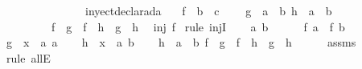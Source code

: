 \begin{isabellebody}
\ \ \ \ \ \ \isamarkupfalse%
\isanewline
\ \ \ \ \isamarkupfalse%
\isanewline
\ \ \isamarkupfalse%
\isanewline
{}\isamarkupfalse%
%
\endisatagproof
{\isafoldproof}%
%
\isadelimproof
\isanewline
%
\endisadelimproof
\isanewline
\isanewline
\isanewline
{}\isamarkupfalse%
\ inyectdeclarada{}{\isacharcolon}\isanewline
\ \ \ f\ {\isacharcolon}{\isacharcolon}\ {\isachardoublequoteopen}{\isacharprime}b\ {\isasymRightarrow}\ {\isacharprime}c{\isachardoublequoteclose}\ \isanewline
\ \ \ {\isachardoublequoteopen}{\isasymforall}{\isacharparenleft}g\ {\isacharcolon}{\isacharcolon}\ {\isacharprime}a\ {\isasymRightarrow}\ {\isacharprime}b{\isacharparenright}\ {\isacharparenleft}h\ {\isacharcolon}{\isacharcolon}\ {\isacharprime}a\ {\isasymRightarrow}\ {\isacharprime}b{\isacharparenright}{\isachardot}\isanewline
\ \ \ \ \ \ \ \ \ {\isacharparenleft}f\ {\isasymcirc}\ g\ {\isacharequal}\ f\ {\isasymcirc}\ h\ {\isasymlongrightarrow}\ g\ {\isacharequal}\ h{\isacharparenright}{\isachardoublequoteclose}\isanewline
{}\ {\isachardoublequoteopen}\ inj\ f{\isachardoublequoteclose}\isanewline
%
\isadelimproof
%
\endisadelimproof
%
\isatagproof
{}\isamarkupfalse%
\ {\isacharparenleft}rule\ injI{\isacharparenright}\isanewline
\ \ \isamarkupfalse%
\ a\ b\ \isanewline
\ \ \isamarkupfalse%
\ {}{\isacharcolon}\ {\isachardoublequoteopen}f\ a\ {\isacharequal}\ f\ b\ {\isachardoublequoteclose}\isanewline
\ \ \isamarkupfalse%
\ {\isacharquery}g\ {\isacharequal}\ {\isachardoublequoteopen}{\isasymlambda}x\ {\isacharcolon}{\isacharcolon}\ {\isacharprime}a{\isachardot}\ a{\isachardoublequoteclose}\isanewline
\ \ \isamarkupfalse%
\ {\isacharquery}h\ {\isacharequal}\ {\isachardoublequoteopen}{\isasymlambda}x\ {\isacharcolon}{\isacharcolon}\ {\isacharprime}a{\isachardot}\ b{\isachardoublequoteclose}\isanewline
\ \ \isamarkupfalse%
\ {\isachardoublequoteopen}{\isasymforall}{\isacharparenleft}h\ {\isacharcolon}{\isacharcolon}\ {\isacharprime}a\ {\isasymRightarrow}\ {\isacharprime}b{\isacharparenright}{\isachardot}\ {\isacharparenleft}f\ {\isasymcirc}\ {\isacharquery}g\ {\isacharequal}\ f\ {\isasymcirc}\ h\ {\isasymlongrightarrow}\ {\isacharquery}g\ {\isacharequal}\ h{\isacharparenright}{\isachardoublequoteclose}\isanewline
\ \ \ \ \isamarkupfalse%
\ assms\ \isamarkupfalse%
\ {\isacharparenleft}rule\ allE{\isacharparenright}\isanewline

\end{isabellebody}
